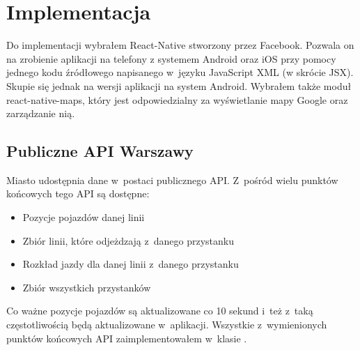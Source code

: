 \documentclass{SGGW-thesis}
\begin{document}
\chapter{Implementacja}
Do implementacji wybrałem React-Native stworzony przez Facebook.
Pozwala on na zrobienie aplikacji na telefony z systemem Android oraz iOS przy pomocy jednego kodu źródłowego napisanego w~języku JavaScript XML (w skrócie JSX).
Skupie się jednak na wersji aplikacji na system Android.
Wybrałem także moduł react-native-maps, który jest odpowiedzialny za wyświetlanie mapy Google oraz zarządzanie nią.

\section{Publiczne API Warszawy}
Miasto udostępnia dane w~postaci publicznego API.
Z~pośród wielu punktów końcowych tego API są dostępne:
\begin{itemize}
  \item{Pozycje pojazdów danej linii}
  \item{Zbiór linii, które odjeżdzają z~danego przystanku}
  \item{Rozkład jazdy dla danej linii z~danego przystanku}
  \item{Zbiór wszystkich przystanków}
\end{itemize}
Co ważne pozycje pojazdów są aktualizowane co 10 sekund i~też z~taką częstotliwością będą aktualizowane w~aplikacji.
Wszystkie z~wymienionych punktów końcowych API zaimplementowałem w~klasie .
\end{document}
